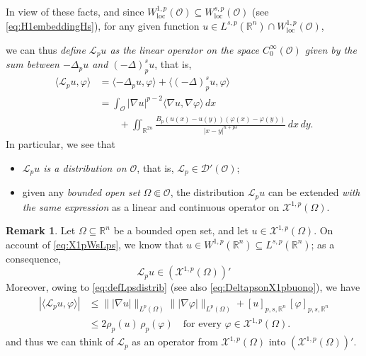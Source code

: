 \documentclass[11pt,a4paper]{amsart}
\def \R {\mathbb{R}}
\def \LL {\mathcal{L}}
\def \Oo {\mathcal{O}}
\theoremstyle{definition}
\newtheorem{remark}[definition]{Remark}
\theoremstyle{plain}
\numberwithin{equation}{section}
\begin{document}
 In view of these facts, and since $W^{1,p}_{\mathrm{loc}}(\Oo)\subseteq W^{s,p}_{\mathrm{loc}}(\Oo)$
 (see \eqref{eq:H1embeddingHs}), 
 for any gi\-ven function $u\in L^{s,p}(\R^n)\cap W^{1,p}_{\mathrm{loc}}(\Oo)$,
 {we can thus \emph{define $\LL_{p} u$
 as the linear o\-pe\-rator
 on the space $C_0^\infty(\Oo)$ given by the sum between $-\Delta_p u$ and $(-\Delta)^s_p u$}, that is,
 \begin{equation} \label{eq:defLpsdistrib}
 \begin{split}
  \langle \LL_{p} u,\varphi\rangle
 & = \langle -\Delta_p u,\varphi\rangle+\langle (-\Delta)^s_p u,\varphi\rangle \\
 & = \int_{\Oo}|\nabla u|^{p-2}\langle
 \nabla u,\nabla \varphi\rangle\,dx
 \\
 & \qquad+ \iint_{\R^{2n}}\frac{B_p(u(x)-u(y))(\varphi(x)-\varphi(y))}{|x-y|^{n+ps}}\,dx\,dy.
 \end{split}
 \end{equation}
 In particular, we see that
 \begin{itemize}
  \item[1)] \emph{$\LL_{p} u$ is a distribution on $\Oo$}, that is, $\LL_{p}\in\mathcal{D}'(\Oo)$;
  \vspace{0.05cm}
  
  \item[2)] given any \emph{bounded open set} $\Omega\Subset \Oo$, the distribution
  $\LL_{p} u$ can be extended 
  \emph{with the same expression} as a linear and continuous operator on $\mathcal{X}^{1,p}(\Omega)$.
 \end{itemize}
 \begin{remark} \label{rem:LuwhenuX12}
 	Let $\Omega\subseteq\mathbb{R}^n$ be a bounded open set, and let
 	 $u\in \mathcal{X}^{1,p}(\Omega)$. On account of \eqref{eq:X1pWsLps},
 	 we know that $u\in W^{1,p}(\mathbb{R}^n)\subseteq
 	 L^{s,p}(\mathbb{R}^n)$;
 	as a consequence,
 	$$\LL_{p}u\in (\mathcal{X}^{1,p}(\Omega))'$$
 	Moreover, owing to \eqref{eq:defLpsdistrib}
 	(see also \eqref{eq:DeltapsonX1pbuono}), we have
 	\begin{align*}
 	 |\langle \LL_{p} u,\varphi\rangle|
 	 & \leq \||\nabla u|\|_{L^p(\Omega)}\||\nabla \varphi|\|_{L^p(\Omega)}
 	 + [u]_{p,s,\mathbb{R}^n}\,[\varphi]_{p,s,\mathbb{R}^n} \\
 	 & \leq 2\rho_p(u)\,\rho_p(\varphi)\quad\text{for every
 	 $\varphi\in \mathcal{X}^{1,p}(\Omega)$}. 	
 	\end{align*}
 	and thus we can think of $\mathcal{L}_p$ as an operator
 	from $\mathcal{X}^{1,p}(\Omega)$ into $(\mathcal{X}^{1,p}(\Omega))'$.
 	\end{remark}
 
}
\end{document}
